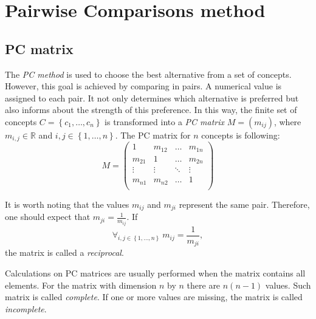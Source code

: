 \chapter{Pairwise Comparisons method}
\label{sec:pcMethod}
  \section{PC matrix}
	\label{subsec:macierzPC}
	
	The \textit{PC method} is used to choose the best alternative from a set of concepts. However, this goal is achieved by comparing in pairs. A numerical value is assigned to each pair. It not only determines which alternative is preferred but also informs about the strength of this preference. In this way, the finite set of concepts $C=\left\{ c_{1},\ldots,c_{n}\right\} $ is transformed into a \textit{PC matrix} $M=\left(m_{ij}\right)$, where $m_{i,j}\in \mathbb{R}$ and $i,j\in\left\{ 1,\ldots,n\right\}$. The PC matrix for $n$ concepts is following:
$$
M = 
\left(
\begin{array}{cccc}
	1 & m_{12} & \dots & m_{1n}\\
	m_{21} & 1 & \dots & m_{2n}\\
	\vdots & \vdots & \ddots & \vdots\\
	m_{n1} & m_{n2} & \dots & 1\\ 	
\end{array}
\right)
$$

	It is worth noting that the values $m_{ij}$ and $m_{ji}$ represent the same pair. Therefore, one should expect that $m_{ji}=\frac{1}{m_{ij}}$. If
	\begin{equation} 
		\forall _{i,j\in\left\{ 1,\ldots,n\right\}} ~m_{ij}=\frac{1}{m_{ji}},
	\end{equation}
		the matrix is called a \textit{reciprocal}.
	
	Calculations on PC matrices are usually performed when the matrix contains all elements. For the matrix with dimension $n$ by $n$ there are $n(n-1)$ values. Such matrix is called \textit{complete}. If one or more values are missing, the matrix is called \textit{incomplete}.


